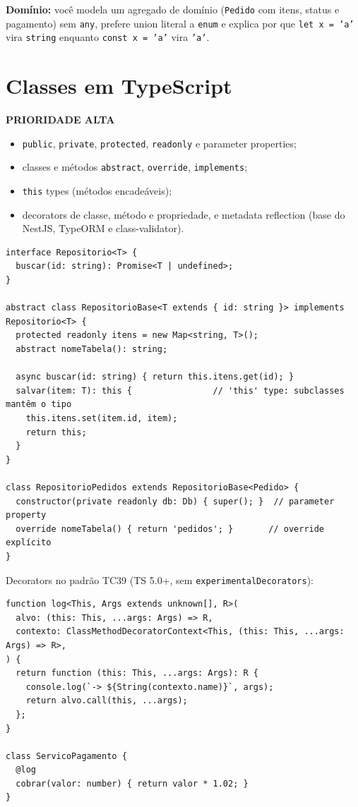 \documentclass[12pt,a4paper,oneside]{book}
\newcommand{\alta}{\colorbox{red!15}{\sffamily\scriptsize\bfseries PRIORIDADE ALTA}}
\newcommand{\code}[1]{\texttt{#1}}
\newcommand{\dom}[1]{\begin{dominio}\textbf{Domínio:} #1\end{dominio}}
\begin{document}
\dom{você modela um agregado de domínio (\code{Pedido} com itens, status e pagamento) sem \code{any}, prefere union literal a \code{enum} e explica por que \code{let x = 'a'} vira \code{string} enquanto \code{const x = 'a'} vira \code{'a'}.}

\section{Classes em TypeScript}
\label{sec:classes}
\alta

\begin{itemize}
  \item \code{public}, \code{private}, \code{protected}, \code{readonly} e parameter properties;
  \item classes e métodos \code{abstract}, \code{override}, \code{implements};
  \item \code{this} types (métodos encadeáveis);
  \item decorators de classe, método e propriedade, e metadata reflection (base do NestJS, TypeORM e class-validator).
\end{itemize}

\begin{verbatim}
interface Repositorio<T> {
  buscar(id: string): Promise<T | undefined>;
}

abstract class RepositorioBase<T extends { id: string }> implements Repositorio<T> {
  protected readonly itens = new Map<string, T>();
  abstract nomeTabela(): string;

  async buscar(id: string) { return this.itens.get(id); }
  salvar(item: T): this {                // 'this' type: subclasses mantêm o tipo
    this.itens.set(item.id, item);
    return this;
  }
}

class RepositorioPedidos extends RepositorioBase<Pedido> {
  constructor(private readonly db: Db) { super(); }  // parameter property
  override nomeTabela() { return 'pedidos'; }       // override explícito
}
\end{verbatim}

Decorators no padrão TC39 (TS 5.0+, sem \code{experimentalDecorators}):

\begin{verbatim}
function log<This, Args extends unknown[], R>(
  alvo: (this: This, ...args: Args) => R,
  contexto: ClassMethodDecoratorContext<This, (this: This, ...args: Args) => R>,
) {
  return function (this: This, ...args: Args): R {
    console.log(`-> ${String(contexto.name)}`, args);
    return alvo.call(this, ...args);
  };
}

class ServicoPagamento {
  @log
  cobrar(valor: number) { return valor * 1.02; }
}
\end{verbatim}
\end{document}
